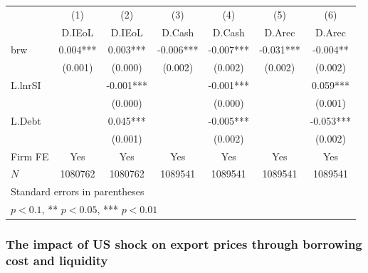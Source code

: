 \documentclass[12pt]{article}
\begin{document}
\begin{center}
\begin{tabular}{l*{6}{c}}
\toprule
            &\multicolumn{1}{c}{(1)}&\multicolumn{1}{c}{(2)}&\multicolumn{1}{c}{(3)}&\multicolumn{1}{c}{(4)}&\multicolumn{1}{c}{(5)}&\multicolumn{1}{c}{(6)}\\
            &\multicolumn{1}{c}{D.IEoL}&\multicolumn{1}{c}{D.IEoL}&\multicolumn{1}{c}{D.Cash}&\multicolumn{1}{c}{D.Cash}&\multicolumn{1}{c}{D.Arec}&\multicolumn{1}{c}{D.Arec}\\
\midrule
brw         &       0.004***&       0.003***&      -0.006***&      -0.007***&      -0.031***&      -0.004** \\
            &     (0.001)         &     (0.000)         &     (0.002)         &     (0.002)         &     (0.002)         &     (0.002)         \\
\addlinespace
L.lnrSI     &                     &      -0.001***&                     &      -0.001***&                     &       0.059***\\
            &                     &     (0.000)         &                     &     (0.000)         &                     &     (0.001)         \\
\addlinespace
L.Debt      &                     &       0.045***&                     &      -0.005***&                     &      -0.053***\\
            &                     &     (0.001)         &                     &     (0.002)         &                     &     (0.002)         \\
\addlinespace
Firm FE     &         Yes         &         Yes         &         Yes         &         Yes         &         Yes         &         Yes         \\
\midrule
\(N\)       &     1080762         &     1080762         &     1089541         &     1089541         &     1089541         &     1089541         \\
\bottomrule
\multicolumn{7}{l}{\footnotesize Standard errors in parentheses}\\
\multicolumn{7}{l}{\footnotesize * \(p<0.1\), ** \(p<0.05\), *** \(p<0.01\)}\\
\end{tabular}
\end{center}

\subsubsection{The impact of US shock on export prices through borrowing cost and liquidity} 
\end{document}
